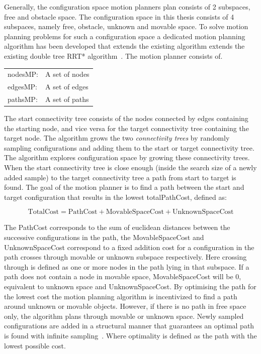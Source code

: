 \textit{}\bs

Generally, the configuration space motion planners plan consists of 2 subspaces, free and obstacle space. The configuration space in this thesis consists of 4 subspaces, namely free, obstacle, unknown and movable space. To solve motion planning problems for such a configuration space a dedicated motion planning algorithm has been developed that extends the existing algorithm extends the existing double tree \ac{RRT*} algorithm~\cite{chen_fast_2018}. The motion planner consists of.
\begin{center}
\begin{tabular}[t]{l p{10cm}}
\gls{nodesMP}:& A set of nodes\\
\gls{edgesMP}:& A set of edges\\
\gls{pathsMP}:& A set of paths\\
\end{tabular}
\end{center}

The start connectivity tree consists of the nodes connected by edges containing the starting node, and vice versa for the target connectivity tree containing the target node. The algorithm grows the two \textit{connectivity trees} by randomly sampling configurations and adding them to the start or target connectivity tree. The algorithm explores configuration space by growing these connectivity trees. When the start connectivity tree is close enough (inside the search size of a newly added sample) to the target connectivity tree a path from start to target is found. The goal of the motion planner is to find a path between the start and target configuration that results in the lowest totalPathCost, defined as:

\[\textrm{TotalCost} = \textrm{PathCost} + \textrm{MovableSpaceCost} + \textrm{UnknownSpaceCost}\]

The PathCost corresponds to the sum of euclidean distances between the successive configurations in the path, the MovableSpaceCost and UnknownSpaceCost correspond to a fixed addition cost for a configuration in the path crosses through movable or unknown subspace respectively. Here crossing through is defined as one or more nodes in the path lying in that subspace. If a path does not contain a node in movable space, MovableSpaceCost will be 0, equivalent to unknown space and UnknownSpaceCost. By optimising the path for the lowest cost the motion planning algorithm is incentivized to find a path around unknown or movable objects. However, if there is no path in free space only, the algorithm plans through movable or unknown space. Newly sampled configurations are added in a structural manner that guarantees an optimal path is found with infinite sampling~\cite{chen_fast_2018}. Where optimality is defined as the path with the lowest possible cost.\bs

